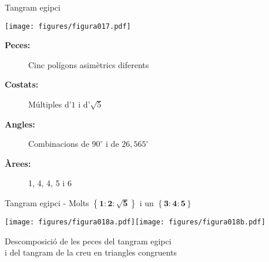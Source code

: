 \documentclass[14pt]{beamer}
\begin{document}
    \begin{frame}{Tangram egipci}
        \begin{center}
            \texttt{[image: figures/figura017.pdf]} \\

            \vspace{2em}

            \begin{minipage}{0.9\textwidth}
                \begin{description}
                    \item[\textbf{Peces:}]   Cinc polígons asimètrics diferents
                    \item[\textbf{Costats:}] Múltiples d'$1$ i d'$\sqrt{5}$
                    \item[\textbf{Angles:}]  Combinacions de $90^\circ$ i de $26,\!565^\circ$
                    \item[\textbf{Àrees:}]   1, 4, 4, 5 i 6
                \end{description}
            \end{minipage}
        \end{center}
    \end{frame}

    \begin{frame}{Tangram egipci - Molts $\mathbf{\left\{1\!\!:\!\!2\!\!:\!\!\sqrt{5}\right\}}$ i un $\mathbf{\left\{3\!\!:\!\!4\!\!:\!\!5\right\}}$}
        \begin{center}
            \texttt{[image: figures/figura018a.pdf]}\qquad\texttt{[image: figures/figura018b.pdf]} \\

            \bigskip

            Descomposició de les peces del tangram egipci\\ i del tangram de la creu en triangles congruents
        \end{center}
    \end{frame}

\end{document}
